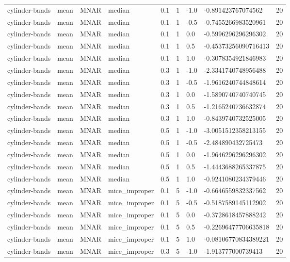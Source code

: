\begin{tabular}{lllllllll}
cylinder-bands & mean & MNAR & median & 0.1 & 1 & -1.0 & -0.891423767074562 & 20 \\
cylinder-bands & mean & MNAR & median & 0.1 & 1 & -0.5 & -0.7455266983520961 & 20 \\
cylinder-bands & mean & MNAR & median & 0.1 & 1 & 0.0 & -0.5996296296296302 & 20 \\
cylinder-bands & mean & MNAR & median & 0.1 & 1 & 0.5 & -0.45373256090716413 & 20 \\
cylinder-bands & mean & MNAR & median & 0.1 & 1 & 1.0 & -0.3078354921846983 & 20 \\
cylinder-bands & mean & MNAR & median & 0.3 & 1 & -1.0 & -2.3341740748956488 & 20 \\
cylinder-bands & mean & MNAR & median & 0.3 & 1 & -0.5 & -1.9616240744848614 & 20 \\
cylinder-bands & mean & MNAR & median & 0.3 & 1 & 0.0 & -1.5890740740740745 & 20 \\
cylinder-bands & mean & MNAR & median & 0.3 & 1 & 0.5 & -1.2165240736632874 & 20 \\
cylinder-bands & mean & MNAR & median & 0.3 & 1 & 1.0 & -0.8439740732525005 & 20 \\
cylinder-bands & mean & MNAR & median & 0.5 & 1 & -1.0 & -3.0051512358213155 & 20 \\
cylinder-bands & mean & MNAR & median & 0.5 & 1 & -0.5 & -2.484890432725473 & 20 \\
cylinder-bands & mean & MNAR & median & 0.5 & 1 & 0.0 & -1.9646296296296302 & 20 \\
cylinder-bands & mean & MNAR & median & 0.5 & 1 & 0.5 & -1.4443688265337875 & 20 \\
cylinder-bands & mean & MNAR & median & 0.5 & 1 & 1.0 & -0.9241080234379446 & 20 \\
cylinder-bands & mean & MNAR & mice\_improper & 0.1 & 5 & -1.0 & -0.6646559832337562 & 20 \\
cylinder-bands & mean & MNAR & mice\_improper & 0.1 & 5 & -0.5 & -0.5187589145112902 & 20 \\
cylinder-bands & mean & MNAR & mice\_improper & 0.1 & 5 & 0.0 & -0.3728618457888242 & 20 \\
cylinder-bands & mean & MNAR & mice\_improper & 0.1 & 5 & 0.5 & -0.22696477706635818 & 20 \\
cylinder-bands & mean & MNAR & mice\_improper & 0.1 & 5 & 1.0 & -0.08106770834389221 & 20 \\
cylinder-bands & mean & MNAR & mice\_improper & 0.3 & 5 & -1.0 & -1.913777000739413 & 20 \\

\end{tabular}
